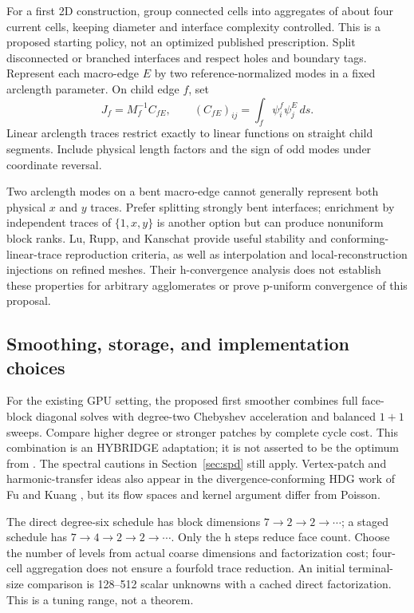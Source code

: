 \documentclass[11pt]{article}
\numberwithin{equation}{section}
\numberwithin{figure}{section}
\numberwithin{table}{section}
\begin{document}
For a first 2D construction, group connected cells into aggregates of about
four current cells, keeping diameter and interface complexity controlled.
This is a proposed starting policy, not an optimized published prescription.
Split disconnected or branched interfaces and respect holes and boundary
tags. Represent each macro-edge $E$ by two reference-normalized modes in a
fixed arclength parameter. On child edge $f$, set
\[
 J_f=M_f^{-1}C_{fE},\qquad
 (C_{fE})_{ij}=\int_f\psi_i^f\psi_j^E\,ds.
\]
Linear arclength traces restrict exactly to linear functions on straight
child segments. Include physical length factors and the sign of odd modes
under coordinate reversal.

Two arclength modes on a bent macro-edge cannot generally represent both
physical $x$ and $y$ traces. Prefer splitting strongly bent interfaces;
enrichment by independent traces of $\{1,x,y\}$ is another option but can
produce nonuniform block ranks. Lu, Rupp, and Kanschat \cite{luinjection}
provide useful stability and conforming-linear-trace reproduction criteria,
as well as interpolation and local-reconstruction injections on refined
meshes. Their h-convergence analysis does not establish these properties for
arbitrary agglomerates or prove p-uniform convergence of this proposal.

\subsection{Smoothing, storage, and implementation choices}
For the existing GPU setting, the proposed first smoother combines full
face-block diagonal solves with degree-two Chebyshev acceleration and
balanced $1+1$ sweeps. Compare higher degree or stronger patches by complete
cycle cost. This combination is an HYBRIDGE adaptation; it is not asserted to
be the optimum from \cite{wildey}. The spectral cautions in
Section~\ref{sec:spd} still apply. Vertex-patch and harmonic-transfer ideas
also appear in the divergence-conforming HDG work of Fu and Kuang
\cite{fuhp}, but its flow spaces and kernel argument differ from Poisson.

The direct degree-six schedule has block dimensions $7\to2\to2\to\cdots$;
a staged schedule has $7\to4\to2\to2\to\cdots$. Only the h steps reduce
face count. Choose the number of levels from actual coarse dimensions and
factorization cost; four-cell aggregation does not ensure a fourfold trace
reduction. An initial terminal-size comparison is 128--512 scalar unknowns
with a cached direct factorization. This is a tuning range, not a theorem.
\end{document}
